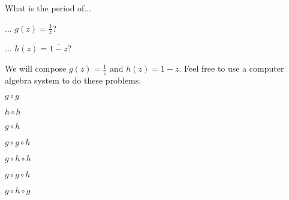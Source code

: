 \documentclass[../gatm_answers.tex]{subfiles}
\begin{document}
\begin{outer_problem}
\item What is the period of...
\end{outer_problem}

\begin{inner_problem}[start=1]
\item ... $g(z)=\frac{1}{\overline{z}}$?
\end{inner_problem}

\begin{inner_problem}
\item ... $h(z)=\overline{1-z}$?
\end{inner_problem}

\begin{outer_problem}
\item We will compose $g(z)=\frac{1}{z}$ and $h(z)=1-z$. Feel free to use a computer algebra system to do these problems.
\end{outer_problem}

\begin{inner_problem}[start=1]
\item $g\circ g$
\end{inner_problem}

\begin{inner_problem}
\item $h\circ h$
\end{inner_problem}

\begin{inner_problem}
\item $g\circ h$
\end{inner_problem}

\begin{inner_problem}
\item $g\circ g\circ h$
\end{inner_problem}

\begin{inner_problem}
\item $g\circ h\circ h$
\end{inner_problem}

\begin{inner_problem}
\item $g\circ g\circ h$
\end{inner_problem}

\begin{inner_problem}
\item $g\circ h\circ g$
\end{inner_problem}
\end{document}
